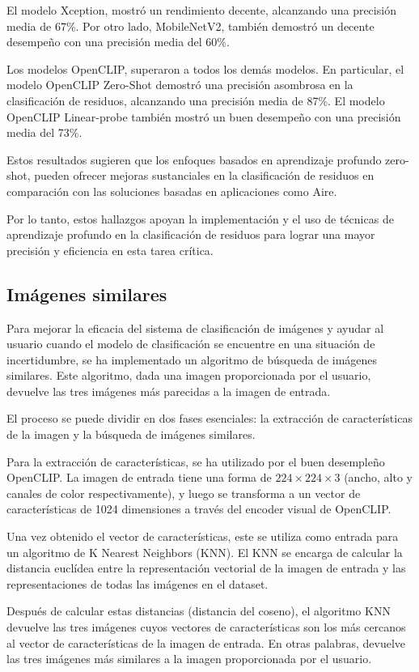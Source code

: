 \documentclass[10pt,a4paper,twocolumn,twoside]{article}
\begin{document}
El modelo Xception, mostró un rendimiento decente, alcanzando una precisión media de 67\%. Por otro lado, MobileNetV2, también demostró un decente desempeño con una precisión media del 60\%.

Los modelos OpenCLIP, superaron a todos los demás modelos. En particular, el modelo OpenCLIP Zero-Shot demostró una precisión asombrosa en la clasificación de residuos, alcanzando una precisión media de 87\%. El modelo OpenCLIP Linear-probe también mostró un buen desempeño con una precisión media del 73\%.

Estos resultados sugieren que los enfoques basados en aprendizaje profundo zero-shot, pueden ofrecer mejoras sustanciales en la clasificación de residuos en comparación con las soluciones basadas en aplicaciones como Aire.

Por lo tanto, estos hallazgos apoyan la implementación y el uso de técnicas de aprendizaje profundo en la clasificación de residuos para lograr una mayor precisión y eficiencia en esta tarea crítica.

\subsection{Imágenes similares}

Para mejorar la eficacia del sistema de clasificación de imágenes y ayudar al usuario cuando el modelo de clasificación se encuentre en una situación de incertidumbre, se ha implementado un algoritmo de búsqueda de imágenes similares. Este algoritmo, dada una imagen proporcionada por el usuario, devuelve las tres imágenes más parecidas a la imagen de entrada.

El proceso se puede dividir en dos fases esenciales: la extracción de características de la imagen y la búsqueda de imágenes similares.

Para la extracción de características, se ha utilizado por el buen desempleño OpenCLIP. La imagen de entrada tiene una forma de $224 \times 224 \times 3$ (ancho, alto y canales de color respectivamente), y luego se transforma a un vector de características de 1024 dimensiones a través del encoder visual de OpenCLIP.

Una vez obtenido el vector de características, este se utiliza como entrada para un algoritmo de K Nearest Neighbors (KNN). El KNN se encarga de calcular la distancia euclídea entre la representación vectorial de la imagen de entrada y las representaciones de todas las imágenes en el dataset.

Después de calcular estas distancias (distancia del coseno), el algoritmo KNN devuelve las tres imágenes cuyos vectores de características son los más cercanos al vector de características de la imagen de entrada. En otras palabras, devuelve las tres imágenes más similares a la imagen proporcionada por el usuario.
\end{document}
